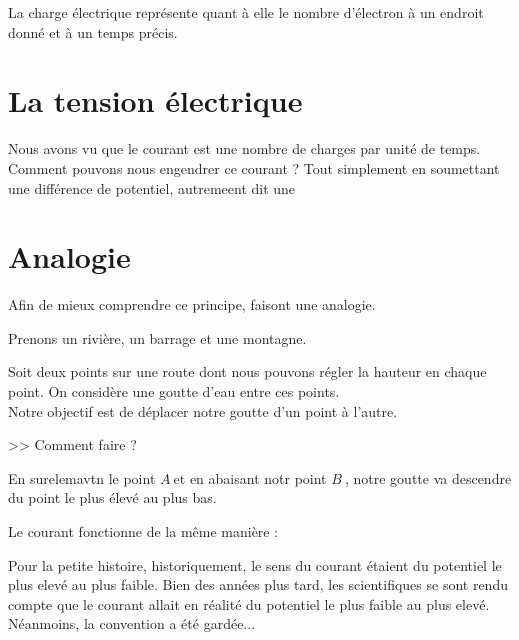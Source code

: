 La charge électrique représente quant à elle le nombre d'électron à un endroit donné et à un temps précis.

\section{La tension électrique}

Nous avons vu que le courant est une nombre de charges par unité de temps. \\
Comment pouvons nous engendrer ce courant ? Tout simplement en soumettant une différence de potentiel, autremeent dit une 

\section{Analogie}
\newcommand{\A}{$A~$}
\newcommand{\B}{$B~$}

Afin de mieux comprendre ce principe, faisont une analogie.

Prenons un rivière, un barrage et une montagne.

Soit deux points sur une route dont nous pouvons régler la hauteur en chaque point. On considère une goutte d'eau entre ces points. \\
Notre objectif est de déplacer notre goutte d'un point à l'autre.

>> Comment faire ?

En surelemavtn le point \A et en abaisant notr point \B, notre goutte va descendre du point le plus élevé au plus bas.

Le courant fonctionne de la même manière : 


Pour la petite histoire, historiquement, le sens du courant étaient du potentiel le plus elevé au plus faible.
Bien des années plus tard, les scientifiques se sont rendu compte que le courant allait en réalité du
potentiel le plus faible au plus elevé. Néanmoins, la convention a été gardée...


